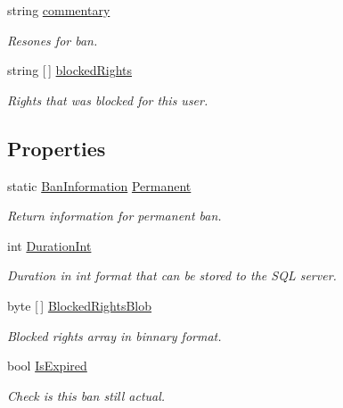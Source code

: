 \begin{DoxyCompactItemize}
string \mbox{\hyperlink{class_authority_controller_1_1_data_1_1_personal_1_1_ban_information_a4b408f380448e918f8915510aaf4c159}{commentary}}
\begin{DoxyCompactList}\small\item\em Resones for ban. \end{DoxyCompactList}\item 
string \mbox{[}$\,$\mbox{]} \mbox{\hyperlink{class_authority_controller_1_1_data_1_1_personal_1_1_ban_information_a3bfad0aa4906e8e60de00e93e4ee52a8}{blocked\+Rights}}
\begin{DoxyCompactList}\small\item\em Rights that was blocked for this user. \end{DoxyCompactList}\end{DoxyCompactItemize}
\subsection*{Properties}
\begin{DoxyCompactItemize}
\item 
static \mbox{\hyperlink{class_authority_controller_1_1_data_1_1_personal_1_1_ban_information}{Ban\+Information}} \mbox{\hyperlink{class_authority_controller_1_1_data_1_1_personal_1_1_ban_information_a129ecfe581f8d778a6b71cd13b7e8b77}{Permanent}}
\begin{DoxyCompactList}\small\item\em Return information for permanent ban. \end{DoxyCompactList}\item 
int \mbox{\hyperlink{class_authority_controller_1_1_data_1_1_personal_1_1_ban_information_ac4ff6168fd023122851068927068178f}{Duration\+Int}}
\begin{DoxyCompactList}\small\item\em Duration in int format that can be stored to the S\+QL server. \end{DoxyCompactList}\item 
byte \mbox{[}$\,$\mbox{]} \mbox{\hyperlink{class_authority_controller_1_1_data_1_1_personal_1_1_ban_information_a6bbdcde258fbc08ded3d2c6d022767f7}{Blocked\+Rights\+Blob}}
\begin{DoxyCompactList}\small\item\em Blocked rights array in binnary format. \end{DoxyCompactList}\item 
bool \mbox{\hyperlink{class_authority_controller_1_1_data_1_1_personal_1_1_ban_information_ad07cbe220f0625c0b22183d764709d74}{Is\+Expired}}
\begin{DoxyCompactList}\small\item\em Check is this ban still actual. \end{DoxyCompactList}\end{DoxyCompactItemize}


